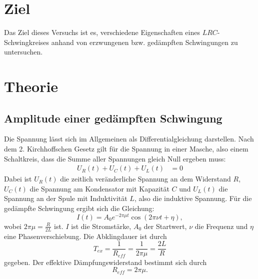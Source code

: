 \section{Ziel}
Das Ziel dieses Versuchs ist es, verschiedene Eigenschaften eines $LRC$-Schwingkreises
anhand von erzwungenen bzw. gedämpften Schwingungen zu untersuchen.

\section{Theorie}
\label{sec:Theorie}
\cite{V354}

\subsection{Amplitude einer gedämpften Schwingung}
Die Spannung lässt sich im Allgemeinen als Differentialgleichung darstellen.
Nach dem 2. Kirchhoffschen Gesetz gilt für die Spannung in einer Masche,
also einem Schaltkreis, dass die Summe aller Spannungen gleich Null ergeben muss:
\begin{align*}
    U_{R}(t)+U_{C}(t)+U_{L}(t) &= 0 
\end{align*}
Dabei ist $U_{R}(t)$ die zeitlich veränderliche Spannung an dem Widerstand $R$,
$U_{C}(t)$ die Spannung am Kondensator mit Kapazität $C$ und $U_{L}(t)$ die Spannung
an der Spule mit Induktivität $L$, also die induktive Spannung.
Für die gedämpfte Schwingung ergibt sich die Gleichung:
\begin{equation}
    I(t)= A_{0} e^{-2 \pi \mu t} \cos(2 \pi \nu t + \eta),
\end{equation}
wobei $2 \pi \mu = \frac{R}{2L}$ ist. $I$ ist die Stromstärke, $A_{0}$ der Startwert,
$\nu$ die Frequenz und $\eta$ eine Phasenverschiebung.
Die Abklingdauer ist durch
\begin{equation}
    T_{ex} = \frac{1}{R_{eff}} = \frac{1}{2 \pi \mu} = \frac{2L}{R}
    \label{eqn:t_ex}
\end{equation}
gegeben.
Der effektive Dämpfungswiderstand bestimmt sich durch
\begin{equation}
    R_{eff} = 2 \pi \mu. %
    \label{eqn:reff}
\end{equation}

